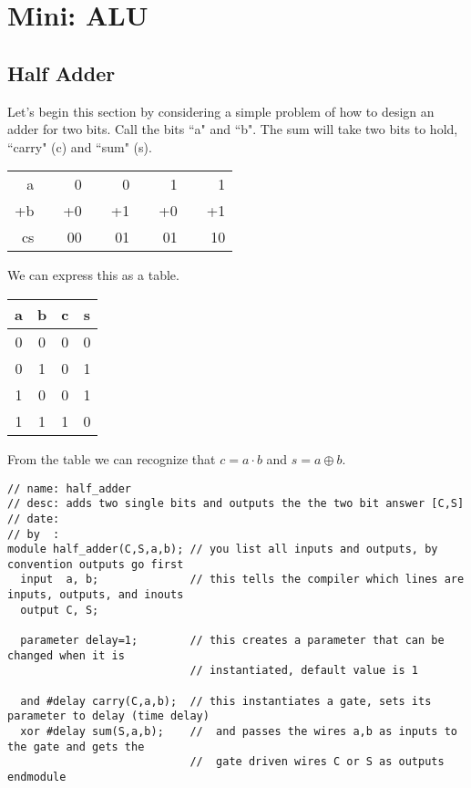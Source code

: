 \chapter{Mini: ALU}
\label{c-lab-alu}

\section{Half Adder}

Let's begin this section by considering a simple problem of how to design an adder for two bits.  Call the bits ``a" and ``b".  The sum will take two bits to hold, ``carry" (c) and ``sum" (s).

\vspace{.1in}
\begin{tabular}{rcrcrcrcr}
 a & &  0 & &  0 & &  1 & &  1 \\
+b & & +0 & & +1 & & +0 & & +1 \\ \cline{1-1} \cline{3-3} \cline{5-5} \cline{7-7} \cline{9-9}
cs & & 00 & & 01 & & 01 & & 10 \\
\end{tabular}

\vspace{.1in}
\noindent
We can express this as a table.

\vspace{.1in}
\begin{tabular}{c|c||c|c}
a & b & c & s \\ \hline
0 & 0 & 0 & 0 \\
0 & 1 & 0 & 1 \\
1 & 0 & 0 & 1 \\
1 & 1 & 1 & 0 \\
\end{tabular}

\vspace{.1in}
\noindent
From the table we can recognize that $c=a\cdot b$ and $s=a\oplus b$.

\begin{verbatim}
// name: half_adder
// desc: adds two single bits and outputs the the two bit answer [C,S]
// date:
// by  :
module half_adder(C,S,a,b); // you list all inputs and outputs, by convention outputs go first
  input  a, b;              // this tells the compiler which lines are inputs, outputs, and inouts
  output C, S;

  parameter delay=1;        // this creates a parameter that can be changed when it is
                            // instantiated, default value is 1

  and #delay carry(C,a,b);  // this instantiates a gate, sets its parameter to delay (time delay)
  xor #delay sum(S,a,b);    //  and passes the wires a,b as inputs to the gate and gets the
                            //  gate driven wires C or S as outputs
endmodule
\end{verbatim}

